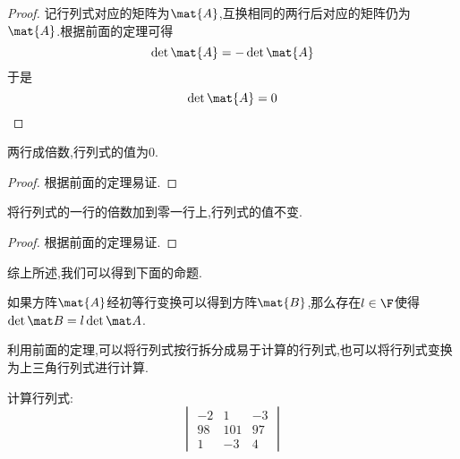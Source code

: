 \documentclass{ctexart}
\begin{document}
\begin{proof}
    记行列式对应的矩阵为$\mat{A}$,互换相同的两行后对应的矩阵仍为$\mat{A}$.根据前面的定理可得
    \[\det\mat{A}=-\det\mat{A}\]
    于是
    \[\det\mat{A}=0\]
\end{proof}
\begin{theorem}
    两行成倍数,行列式的值为$0$.
\end{theorem}
\begin{proof}
    根据前面的定理易证.
\end{proof}
\begin{theorem}
    将行列式的一行的倍数加到零一行上,行列式的值不变.
\end{theorem}
\begin{proof}
    根据前面的定理易证.
\end{proof}
综上所述,我们可以得到下面的命题.
\begin{theorem}
    如果方阵$\mat{A}$经初等行变换可以得到方阵$\mat{B}$,那么存在$l\in\F$使得$\det\mat B=l\det\mat A$.
\end{theorem}
利用前面的定理,可以将行列式按行拆分成易于计算的行列式,也可以将行列式变换为上三角行列式进行计算.
\begin{problem}
    计算行列式:
    \[\begin{vmatrix}
        -2&1&-3\\
        98&101&97\\
        1&-3&4
    \end{vmatrix}\]
\end{problem}
\end{document}
